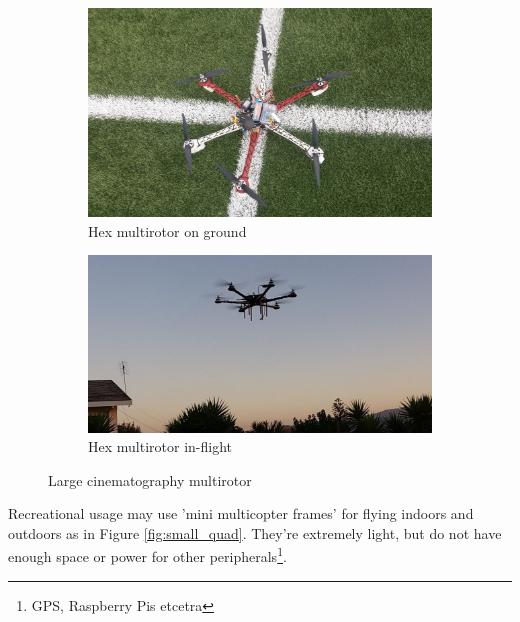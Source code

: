 \begin{figure}[H]
\begin{subfigure}{0.5\textwidth}
\centering
\includegraphics[scale=0.11]{images/hex3.jpg}
\caption{Hex multirotor on ground}
\end{subfigure}
\begin{subfigure}{0.5\textwidth}
\centering
\includegraphics[scale=0.3]{images/hex2.jpg}
\caption{Hex multirotor in-flight}
\end{subfigure}
\caption{Large cinematography multirotor}
\label{fig:hex}
\end{figure}

Recreational usage may use 'mini multicopter frames' for flying indoors and outdoors \cite{frame} as in Figure \ref{fig:small_quad}. They're extremely light, but do not have enough space or power for other peripherals\footnote{GPS, Raspberry Pis etcetra}.\\

